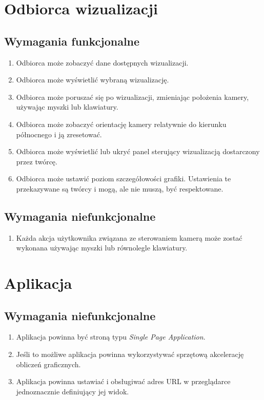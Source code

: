 \section{Odbiorca wizualizacji}

\subsection{Wymagania funkcjonalne}
\begin{enumerate}
    \item Odbiorca może zobaczyć dane dostępnych wizualizacji.
    \item Odbiorca może wyświetlić wybraną wizualizację.
    \item Odbiorca może poruszać się po wizualizacji, zmieniając położenia kamery, używając myszki lub klawiatury.
    \item Odbiorca może zobaczyć orientację kamery relatywnie do kierunku północnego i ją zresetować.
    \item Odbiorca może wyświetlić lub ukryć panel sterujący wizualizacją dostarczony przez twórcę.
    \item Odbiorca może ustawić poziom szczegółowości grafiki. Ustawienia te przekazywane są twórcy i mogą, ale nie muszą, być respektowane.
\end{enumerate}
\subsection{Wymagania niefunkcjonalne}
\begin{enumerate}
    \item Każda akcja użytkownika związana ze sterowaniem kamerą może zostać wykonana używając myszki lub równolegle klawiatury.
\end{enumerate}

\section{Aplikacja}

\subsection{Wymagania niefunkcjonalne}
\begin{enumerate}
    \item Aplikacja powinna być stroną typu \textit{Single Page Application}. %
    \item Jeśli to możliwe aplikacja powinna wykorzystywać sprzętową akcelerację obliczeń graficznych.
    \item Aplikacja powinna ustawiać i obsługiwać adres URL w przeglądarce jednoznacznie definiujący jej widok.
\end{enumerate}


